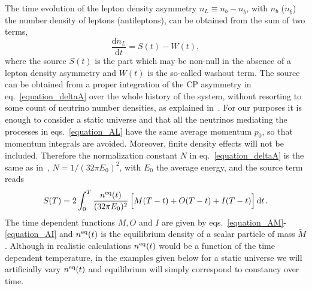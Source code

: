 \documentclass[11pt,a4paper]{article}
\providecommand{\dif}[0]{\mathrm{d}}
\providecommand{\mmed}[0]{\tilde{M}}
\providecommand{\emed}[0]{E_0}
\begin{document}
The time evolution of the lepton density asymmetry $n_L \equiv n_b - n_{\bar b}$, with $n_b$ ($n_{\bar b}$) the number density of leptons (antileptons), can be obtained from the sum of two terms, 
 \begin{equation}
 \frac{\dif n_L}{\dif t} = S(t) - W(t),
 \end{equation}
 where the source $S(t)$ is the part which may be non-null in the absence of a lepton density asymmetry and $W(t)$ is the so-called washout term. The source can be obtained from a proper integration of the CP asymmetry in eq.~\eqref{equation_deltaA} over the whole history of the system, without resorting to some count of neutrino number densities, as explained in~\cite{Racker20}. For our purposes it is enough to consider a static universe and that all the neutrinos mediating the processes in eqs.~\eqref{equation_AL} have the same average momentum $p_0$, so that momentum integrals are avoided. Moreover, finite density effects will not be included.
Therefore the normalization constant $N$ in eq.~\eqref{equation_deltaA} is the same as in~\cite{Racker20}, $N=1/(32 \pi \emed)^2$, with $\emed$ the average energy, and the source term reads
 \begin{equation}
 \label{equation_source}
 S(T) = 2 \int_0^T \frac{n^{\rm eq}(t)}{(32 \pi \emed)^2} \, \Big[M(T-t) + O(T-t) + I(T-t) \Big] \, \dif t \, .
 \end{equation}
 The time dependent functions $M, O$ and $I$ are given by eqs.~\eqref{equation_AM}-\eqref{equation_AI} and $n^{\rm eq}(t)$ is the equilibrium density of a scalar particle of mass $\mmed$. Although in realistic calculations $n^{\rm eq}(t)$ would be a function of the time dependent temperature, in the examples given below for a static universe we will artificially vary $n^{\rm eq}(t)$ and equilibrium will simply correspond to constancy over time.
\end{document}
